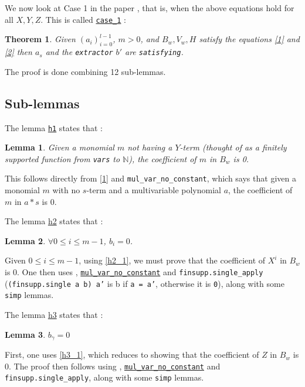 \documentclass{article}
\newtheorem{lemma}{Lemma}
\newtheorem{theorem}{Theorem}
\theoremstyle{definition}
\theoremstyle{remark}
\begin{document}
We now look at Case 1 in the paper \cite{main}, that is, when the above equations hold for all $X, Y, Z$. This is called 
\href{https://github.com/BoltonBailey/formal-snarks-project/blob/7fd9cd122f5887f88f6a706b4f2a68a7153c7381/src/snarks/babysnark/knowledge_soundness.lean#L351}{\texttt{case\_1}} : 
\theoremstyle{theorem}
\begin{theorem}
  Given $(a_i)_{i = 0}^{l - 1}$, $m > 0$, and $B_w, V_w, H$ satisfy the equations \eqref{1} and \eqref{2} then $a_s$ and the \texttt{extractor} $b'$ are \texttt{satisfying}.
\end{theorem}

The proof is done combining 12 sub-lemmas.

\subsection{Sub-lemmas}
The lemma \href{https://github.com/BoltonBailey/formal-snarks-project/blob/7fd9cd122f5887f88f6a706b4f2a68a7153c7381/src/snarks/babysnark/knowledge_soundness.lean#L362}{\texttt{h1}} states that :
\theoremstyle{lemma}
\begin{lemma}
  Given a monomial $m$ not having a $Y$-term (thought of as a finitely supported function from \texttt{vars} to $\mathbb{N}$), the coefficient of $m$ in $B_w$ is 0.
\end{lemma}
This follows directly from \eqref{1} and \texttt{mul\_var\_no\_constant}, which says that given a monomial $m$ with no $s$-term and a multivariable polynomial $a$, the coefficient of $m$ in $a * s$ is 0.

The lemma \href{https://github.com/BoltonBailey/formal-snarks-project/blob/7fd9cd122f5887f88f6a706b4f2a68a7153c7381/src/snarks/babysnark/knowledge_soundness.lean#L366}{h2} states that :
\theoremstyle{lemma}
\begin{lemma} \label{h2}
  $\forall 0 \le i \le m - 1$, $b_i = 0$.
\end{lemma}
Given $0 \le i \le m - 1$, using \ref{h2_1}, we must prove that the coefficient of $X^i$ in $B_w$ is 0. One then uses , 
\href{https://github.com/BoltonBailey/formal-snarks-project/blob/7fd9cd122f5887f88f6a706b4f2a68a7153c7381/src/general_lemmas/mv_divisability.lean#L193}{\texttt{mul\_var\_no\_constant}} and 
\texttt{finsupp.single\_apply} (\texttt{(finsupp.single a b) a'} is b if \texttt{a = a'}, otherwise it is \texttt{0}), along with some \texttt{simp} lemmas.

The lemma \href{https://github.com/BoltonBailey/formal-snarks-project/blob/7fd9cd122f5887f88f6a706b4f2a68a7153c7381/src/snarks/babysnark/knowledge_soundness.lean#L366}{h3} states that :
\theoremstyle{lemma}
\begin{lemma} \label{h3}
  $b_{\gamma} = 0$
\end{lemma}
First, one uses \ref{h3_1}, which reduces to showing that the coefficient of $Z$ in $B_w$ is 0. The proof then follows using , \href{https://github.com/BoltonBailey/formal-snarks-project/blob/7fd9cd122f5887f88f6a706b4f2a68a7153c7381/src/general_lemmas/mv_divisability.lean#L193}{\texttt{mul\_var\_no\_constant}} and 
\texttt{finsupp.single\_apply}, along with some \texttt{simp} lemmas.
\end{document}
